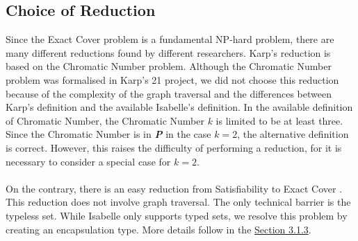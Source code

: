 \subsection{Choice of Reduction}
Since the Exact Cover problem is a fundamental NP-hard problem, there are many different reductions found by different researchers. 
Karp's reduction\cite{karp2010reducibility} is based on the  Chromatic Number problem. 
Although the Chromatic Number problem was formalised in Karp's 21 project, we did not choose this reduction
because of the complexity of the graph traversal and the differences between Karp's definition and the available Isabelle's definition. 
In the available definition of Chromatic Number, the Chromatic Number $k$ is limited to be at least three. Since 
the Chromatic Number is in \textbf{\textit{P}} in the case $k = 2$, the alternative definition is correct. However, this raises the difficulty of performing 
a reduction, for it is necessary to consider a special case for $k = 2$.\\\\ 
On the contrary, there is an easy reduction from Satisfiability to Exact Cover \cite{STKXCH}. This reduction does not involve graph traversal.
The only technical barrier is the typeless set. While Isabelle only supports typed sets, we resolve this problem
by creating an encapsulation type. More details follow in the \hyperref[sec:sat-imp]{Section 3.1.3}. 

